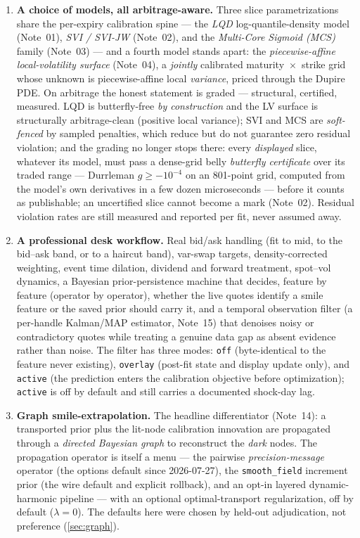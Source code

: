 \documentclass[11pt]{article}
\begin{document}
\begin{enumerate}[leftmargin=1.6em]
\item \textbf{A choice of models, all arbitrage-aware.} Three slice
parametrizations share the per-expiry calibration spine --- the \emph{LQD}
log-quantile-density model (Note~01), \emph{SVI / SVI-JW} (Note~02), and the
\emph{Multi-Core Sigmoid (MCS)} family (Note~03) --- and a fourth model stands
apart: the \emph{piecewise-affine local-volatility surface} (Note~04), a
\emph{jointly} calibrated maturity~$\times$~strike grid whose unknown is
piecewise-affine local \emph{variance}, priced through the Dupire PDE. On
arbitrage the honest statement is graded --- structural, certified, measured.
LQD is butterfly-free \emph{by construction} and the LV surface is
structurally arbitrage-clean (positive local variance); SVI and MCS are
\emph{soft-fenced} by sampled penalties, which reduce but do not guarantee
zero residual violation; and the grading no longer stops there: every
\emph{displayed} slice, whatever its model, must pass a dense-grid belly
\emph{butterfly certificate} over its traded range --- Durrleman
$g\ge-10^{-4}$ on an 801-point grid, computed from the model's own
derivatives in a few dozen microseconds --- before it counts as publishable;
an uncertified slice cannot become a mark (Note~02). Residual violation
rates are still measured and reported per fit, never assumed away.
\item \textbf{A professional desk workflow.} Real bid/ask handling (fit to mid,
to the bid--ask band, or to a haircut band), var-swap targets, density-corrected
weighting, event time dilation, dividend and forward treatment, spot--vol
dynamics, a Bayesian prior-persistence machine that decides, feature by feature
(operator by operator), whether the live quotes identify a smile feature or the
saved prior should carry it, and a temporal observation filter (a per-handle
Kalman/MAP estimator, Note~15) that denoises noisy or contradictory quotes while
treating a genuine data gap as absent evidence rather than noise. The filter has
three modes: \texttt{off} (byte-identical to the feature never existing),
\texttt{overlay} (post-fit state and display update only), and \texttt{active}
(the prediction enters the calibration objective before optimization);
\texttt{active} is off by default and still carries a documented shock-day lag.
\item \textbf{Graph smile-extrapolation.} The headline differentiator (Note~14):
a transported prior plus the lit-node calibration innovation are propagated
through a \emph{directed Bayesian graph} to reconstruct the \emph{dark} nodes.
The propagation operator is itself a menu --- the pairwise
\emph{precision-message} operator (the options default since 2026-07-27),
the \texttt{smooth\_field} increment prior (the wire default and explicit
rollback), and an opt-in layered dynamic-harmonic
pipeline --- with an optional optimal-transport regularization, off by default
($\lambda=0$). The defaults here were chosen by held-out adjudication, not
preference (\cref{sec:graph}).
\end{enumerate}
\end{document}
